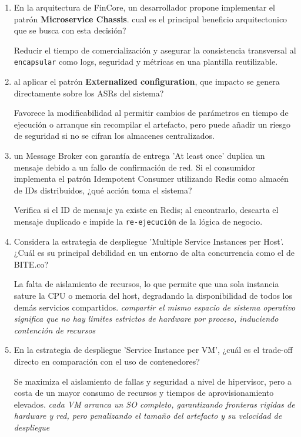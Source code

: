 
\begin{enumerate}

\item En la arquitectura de FinCore, un desarrollador propone implementar el patrón \textbf{Microservice Chassis}. cual es el principal beneficio arquitectonico que se busca con esta decisión?

Reducir el tiempo de comercialización y asegurar la consistencia transversal al \texttt{encapsular} como logs, seguridad y métricas en una plantilla reutilizable.

\item al aplicar el patrón \textbf{Externalized configuration}, que impacto se genera directamente sobre los ASRs del sistema?

Favorece la modificabilidad al permitir cambios de parámetros en tiempo de ejecución o arranque sin recompilar el artefacto, pero puede añadir un riesgo de seguridad si no se cifran los almacenes centralizados.

\item un Message Broker con garantía de entrega 'At least once' duplica un mensaje debido a un fallo de confirmación de red. Si el consumidor implementa el patrón Idempotent Consumer utilizando Redis como almacén de IDs distribuidos, ¿qué acción toma el sistema?

Verifica si el ID de mensaje ya existe en Redis; al encontrarlo, descarta el mensaje duplicado e impide la \texttt{re-ejecución} de la lógica de negocio.

\item Considera la estrategia de despliegue 'Multiple Service Instances per Host'. ¿Cuál es su principal debilidad en un entorno de alta concurrencia como el de BITE.co?

La falta de aislamiento de recursos, lo que permite que una sola instancia sature la CPU o memoria del host, degradando la disponibilidad de todos los demás servicios compartidos. \textit{compartir el mismo espacio de sistema operativo significa que no hay limites estrictos de hardware por proceso, induciendo contención de recursos}

\item En la estrategia de despliegue 'Service Instance per VM', ¿cuál es el trade-off directo en comparación con el uso de contenedores?

Se maximiza el aislamiento de fallas y seguridad a nivel de hipervisor, pero a costa de un mayor consumo de recursos y tiempos de aprovisionamiento elevados. \textit{cada VM arranca un SO completo, garantizando fronteras rigidas de hardware y red, pero penalizando el tamaño del artefacto y su velocidad de despliegue}


\end{enumerate}
